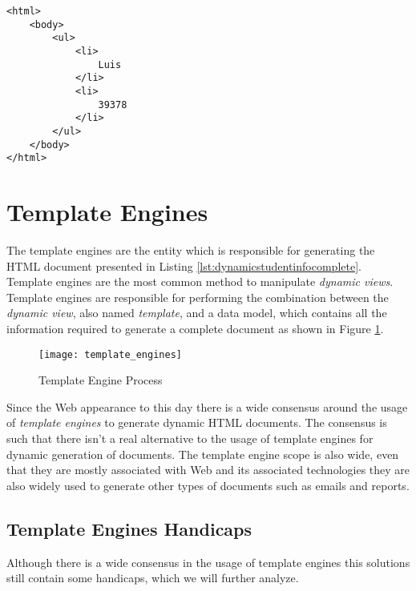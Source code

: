 \bigskip

\lstset{language=html}

\begin{minipage}{\linewidth}
\begin{lstlisting}[caption={Dynamic Student Info}, label={lst:dynamicstudentinfocomplete}]
<html>
    <body>
        <ul>
            <li>
                Luis
            </li>
            <li>
                39378
            </li>
        </ul>
    </body>
</html>
\end{lstlisting}
\end{minipage} 

\section{Template Engines}
\label{sec:templateengines}

The template engines are the entity which is responsible for generating the \ac{HTML} document presented in Listing \ref{lst:dynamicstudentinfocomplete}. Template engines are the most common method to manipulate \textit{dynamic views}. Template engines are responsible for performing the combination between the \textit{dynamic view}, also named \textit{template}, and a data model, which contains all the information required to generate a complete document as shown in Figure \ref{img:templateengineprocess}.

\begin{figure}[H]
	\centering
	\texttt{[image: template\_engines]}
	\caption{Template Engine Process}
	\label{img:templateengineprocess}
\end{figure}

\noindent
Since the Web appearance to this day there is a wide consensus around the usage of \textit{template engines} to generate dynamic \ac{HTML} documents. The consensus is such that there isn't a real alternative to the usage of template engines for dynamic generation of documents.  The template engine scope is also wide, even that they are mostly associated with Web and its associated technologies they are also widely used to generate other types of documents such as emails and reports. 

\subsection{Template Engines Handicaps}
\label{subsec:templateengineshandicaps}

Although there is a wide consensus in the usage of template engines this solutions still contain some handicaps, which we will further analyze.

